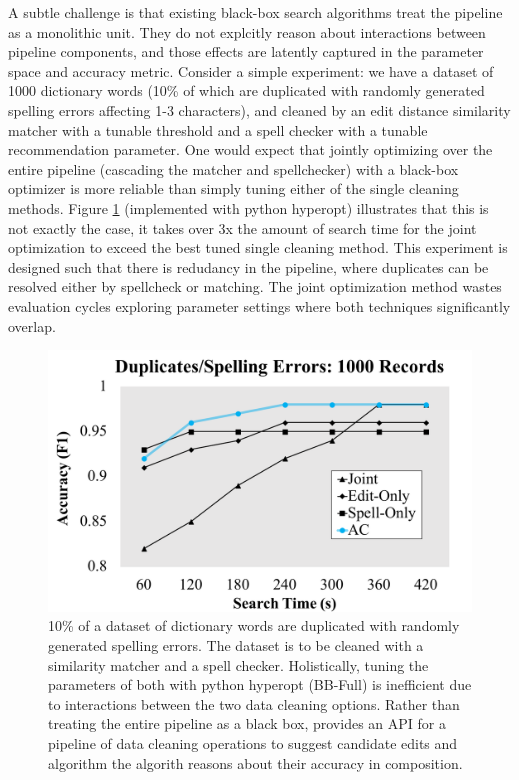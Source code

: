 A subtle challenge is that existing black-box search algorithms treat the pipeline as a monolithic unit.
They do not explcitly reason about interactions between pipeline components, and those effects are latently captured in the parameter space and accuracy metric.
Consider a simple experiment: we have a dataset of 1000 dictionary words (10\% of which are duplicated with randomly generated spelling errors affecting 1-3 characters), and cleaned by an edit distance similarity matcher with a tunable threshold and a spell checker with a tunable recommendation parameter.
 One would expect that jointly optimizing over the entire pipeline (cascading the matcher and spellchecker) with a black-box optimizer is more reliable than simply tuning either of the single cleaning methods. 
Figure \ref{fig:teaser} (implemented with \textsf{python hyperopt}) illustrates that this is not exactly the case, it takes over 3x the amount of search time for the joint optimization to exceed the best tuned single cleaning method.
This experiment is designed such that there is redudancy in the pipeline, where duplicates can be resolved either by spellcheck or matching.
The joint optimization method wastes evaluation cycles exploring parameter settings where both techniques significantly overlap.


\begin{figure}[t]
\centering
 \includegraphics[width=\columnwidth]{figures/teaser-experiment.png}
 \caption{\small 10\% of a dataset of dictionary words are duplicated with randomly generated spelling errors. The dataset is to be cleaned with a similarity matcher and a spell checker. Holistically, tuning the parameters of both with \textsf{python hyperopt} (BB-Full) is inefficient due to interactions between the two data cleaning options. Rather than treating the entire pipeline as a black box, \sys provides an API for a pipeline of data cleaning operations to suggest candidate edits and algorithm the algorith reasons about their accuracy in composition. \label{fig:teaser}}
\end{figure}

